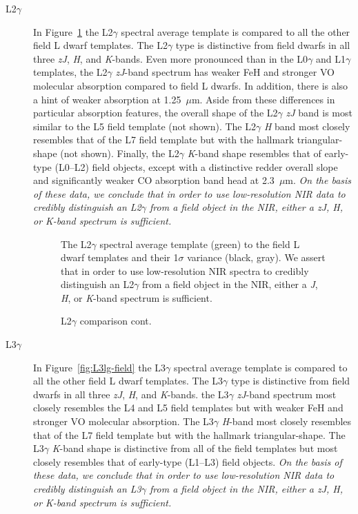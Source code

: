 \documentclass[12pt]{aastex6}
\begin{document}
\begin{description}
\item[L2$\gamma$]{
In Figure~\ref{fig:L2lg-field} the L2$\gamma$ spectral average template is compared to all the other field L dwarf templates.
The L2$\gamma$ type is distinctive from field dwarfs in all three \emph{zJ}, \emph{H}, and \emph{K}-bands.
Even more pronounced than in the L0$\gamma$ and L1$\gamma$ templates, the L2$\gamma$ \emph{zJ}-band spectrum has weaker FeH and stronger VO molecular absorption compared to field L dwarfs.
In addition, there is also a hint of weaker  absorption at 1.25~$\mu$m. Aside from these differences in particular absorption features, the overall shape of the L2$\gamma$ \emph{zJ} band is most similar to the L5 field template (not shown).
The L2$\gamma$ \emph{H} band most closely resembles that of the L7 field template but with the hallmark  triangular-shape (not shown).
Finally, the L2$\gamma$ \emph{K}-band shape resembles that of early-type (L0--L2) field objects, except with a distinctive redder overall slope and significantly weaker CO absorption band head at 2.3~$\mu$m.
\emph{On the basis of these data, we conclude that in order to use low-resolution NIR data to credibly distinguish an L2$\gamma$ from a field object in the NIR, either a \emph{zJ}, \emph{H}, or \emph{K}-band spectrum is sufficient.}
}

\begin{figure}[b]
    \caption{The L2$\gamma$ spectral average template (green) to the field L dwarf templates and their 1$\sigma$ variance (black, gray).
    We assert that in order to use low-resolution NIR spectra to credibly distinguish an L2$\gamma$ from a field object in the NIR, either a \emph{J}, \emph{H}, or \emph{K}-band spectrum is sufficient.}
    \label{fig:L2lg-field}
\end{figure}

\begin{figure}
  \caption{L2$\gamma$ comparison cont.}
\end{figure}
\clearpage

\item[L3$\gamma$]{
In Figure~\ref{fig:L3lg-field} the L3$\gamma$ spectral average template is compared to all the other field L dwarf templates.
The L3$\gamma$ type is distinctive from field dwarfs in all three \emph{zJ}, \emph{H}, and \emph{K}-bands.
the L3$\gamma$ \emph{zJ}-band spectrum most closely resembles the L4 and L5 field templates but with weaker FeH and stronger VO molecular absorption.
The L3$\gamma$ \emph{H}-band most closely resembles that of the L7 field template but with the hallmark triangular-shape.
The L3$\gamma$ \emph{K}-band shape is distinctive from all of the field templates but most closely resembles that of early-type (L1--L3) field objects.
\emph{On the basis of these data, we conclude that in order to use low-resolution NIR data to credibly distinguish an L3$\gamma$ from a field object in the NIR, either a \emph{zJ}, \emph{H}, or \emph{K}-band spectrum is sufficient.}
}


\end{description}
\end{document}
